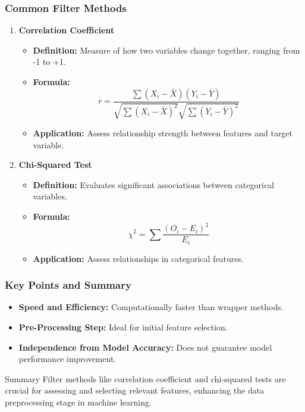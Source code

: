 \documentclass[aspectratio=169]{beamer}
\begin{document}
\begin{frame}[fragile]
    \frametitle{Common Filter Methods}
    \begin{enumerate}
        \item \textbf{Correlation Coefficient}
        \begin{itemize}
            \item \textbf{Definition:} Measure of how two variables change together, ranging from -1 to +1.
            \item \textbf{Formula:}
            \begin{equation}
                r = \frac{\sum (X_i - \bar{X})(Y_i - \bar{Y})}{\sqrt{\sum (X_i - \bar{X})^2} \sqrt{\sum (Y_i - \bar{Y})^2}}
            \end{equation}
            \item \textbf{Application:} Assess relationship strength between features and target variable.
        \end{itemize}
        
        \item \textbf{Chi-Squared Test}
        \begin{itemize}
            \item \textbf{Definition:} Evaluates significant associations between categorical variables.
            \item \textbf{Formula:}
            \begin{equation}
                \chi^2 = \sum \frac{(O_i - E_i)^2}{E_i}
            \end{equation}
            \item \textbf{Application:} Assess relationships in categorical features.
        \end{itemize}
    \end{enumerate}
\end{frame}

\begin{frame}[fragile]
    \frametitle{Key Points and Summary}
    \begin{itemize}
        \item \textbf{Speed and Efficiency:} Computationally faster than wrapper methods.
        \item \textbf{Pre-Processing Step:} Ideal for initial feature selection.
        \item \textbf{Independence from Model Accuracy:} Does not guarantee model performance improvement.
    \end{itemize}
    \begin{block}{Summary}
        Filter methods like correlation coefficient and chi-squared tests are crucial for assessing and selecting relevant features, enhancing the data preprocessing stage in machine learning.
    \end{block}
\end{frame}
\end{document}

